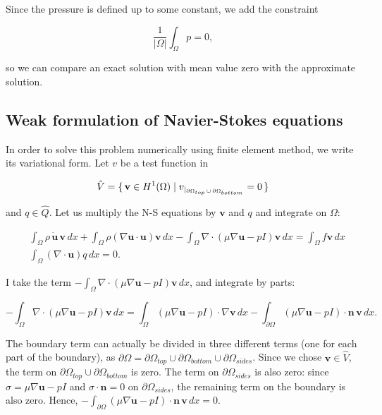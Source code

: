 \documentclass[11pt,a4paper,titlepage]{report}
\begin{document}
Since the pressure is defined up to some constant, we add the constraint

\[
\frac{1}{|\Omega |} \int_{\Omega} p = 0,
\]

so we can compare an exact solution with mean value zero with the approximate solution.

\subsection{Weak formulation of Navier-Stokes equations}


In order to solve this problem numerically using finite element method, we write its variational form. Let $v$ be a test function in

\[
\hat{V} = \set{\mathbf{v} \in H^1(\Omega) | v_{|_{\partial \Omega_{top} \, \cup \, \partial \Omega_{bottom}}} = 0}
\]

and $q \in \hat{Q}$. Let us multiply the N-S equations by $\mathbf{v}$ and $q$ and integrate on $\Omega$:

\begin{align}
&\int_{\Omega} \rho \, \dot{\mathbf{u}} \, \mathbf{v} \, dx
+ \int_{\Omega} \rho (\nabla \mathbf{u} \cdot \mathbf{u} )\mathbf{v} \, dx
- \int_{\Omega} \nabla \cdot (\mu \nabla \mathbf{u} - pI)\mathbf{v} \, dx
= \int_{\Omega} f\mathbf{v} \, dx \\
&\int_{\Omega} (\nabla \cdot \mathbf{u}) q \, dx = 0.
\end{align}

I take the term $- \int_{\Omega} \nabla \cdot (\mu \nabla \mathbf{u} - pI)\mathbf{v} \, dx$, and integrate by parts:

\[
- \int_{\Omega} \nabla \cdot (\mu \nabla \mathbf{u} - pI)\mathbf{v} \, dx
= \int_{\Omega} (\mu \nabla \mathbf{u} - pI) \cdot \nabla \mathbf{v} \, dx
- \int_{\partial \Omega} (\mu \nabla \mathbf{u} - pI) \cdot \mathbf{n} \, \mathbf{v} \, dx.
\]

The boundary term can actually be divided in three different terms (one for each part of the boundary), as $\partial \Omega = \partial \Omega_{top} \cup \partial \Omega_{bottom} \cup \partial \Omega_{sides}$. Since we chose $\mathbf{v} \in \hat{V}$, the term on $\partial \Omega_{top} \cup \partial \Omega_{bottom}$ is zero. The term on $\partial \Omega_{sides}$ is also zero: since $\sigma = \mu \nabla \mathbf{u} - pI$ and $\sigma \cdot \mathbf{n} = 0$ on $\partial \Omega_{sides}$, the remaining term on the boundary is also zero. Hence, $- \int_{\partial \Omega} (\mu \nabla \mathbf{u} - pI) \cdot \mathbf{n} \, \mathbf{v} \, dx = 0$.
\end{document}
